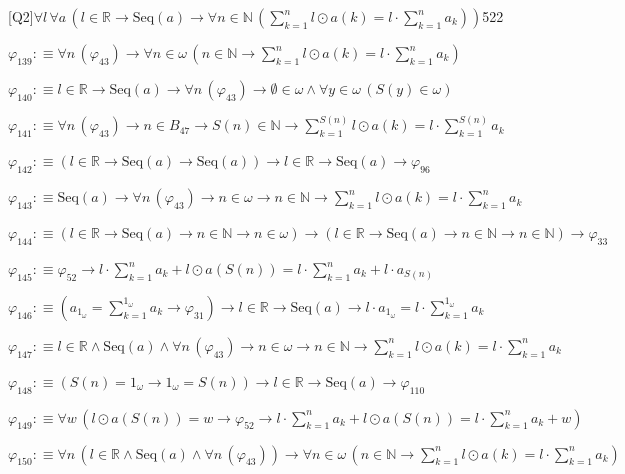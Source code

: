 \begin{fullproof}{[Q2]}{$\forall l\,\forall a\,(l \in \mathbb{R} \to \mathrm{Seq}(a) \to \forall n \in \mathbb{N}\,({\textstyle\sum_{k=1}^{n} l \odot a(k)} = l \cdot {\textstyle\sum_{k=1}^{n} a_{k}}))$}{522}
\begin{abbrevlist}
\item $\varphi_{139} :\equiv \forall n\,(\varphi_{43}) \to \forall n \in \omega\,(n \in \mathbb{N} \to {\textstyle\sum_{k=1}^{n} l \odot a(k)} = l \cdot {\textstyle\sum_{k=1}^{n} a_{k}})$
\item $\varphi_{140} :\equiv l \in \mathbb{R} \to \mathrm{Seq}(a) \to \forall n\,(\varphi_{43}) \to \emptyset \in \omega \land \forall y \in \omega\,(S(y) \in \omega)$
\item $\varphi_{141} :\equiv \forall n\,(\varphi_{43}) \to n \in B_{47} \to S(n) \in \mathbb{N} \to {\textstyle\sum_{k=1}^{S(n)} l \odot a(k)} = l \cdot {\textstyle\sum_{k=1}^{S(n)} a_{k}}$
\item $\varphi_{142} :\equiv (l \in \mathbb{R} \to \mathrm{Seq}(a) \to \mathrm{Seq}(a)) \to l \in \mathbb{R} \to \mathrm{Seq}(a) \to \varphi_{96}$
\item $\varphi_{143} :\equiv \mathrm{Seq}(a) \to \forall n\,(\varphi_{43}) \to n \in \omega \to n \in \mathbb{N} \to {\textstyle\sum_{k=1}^{n} l \odot a(k)} = l \cdot {\textstyle\sum_{k=1}^{n} a_{k}}$
\item $\varphi_{144} :\equiv (l \in \mathbb{R} \to \mathrm{Seq}(a) \to n \in \mathbb{N} \to n \in \omega) \to (l \in \mathbb{R} \to \mathrm{Seq}(a) \to n \in \mathbb{N} \to n \in \mathbb{N}) \to \varphi_{33}$
\item $\varphi_{145} :\equiv \varphi_{52} \to l \cdot {\textstyle\sum_{k=1}^{n} a_{k}} + l \odot a(S(n)) = l \cdot {\textstyle\sum_{k=1}^{n} a_{k}} + l \cdot a_{S(n)}$
\item $\varphi_{146} :\equiv (a_{1_{\omega}} = {\textstyle\sum_{k=1}^{1_{\omega}} a_{k}} \to \varphi_{31}) \to l \in \mathbb{R} \to \mathrm{Seq}(a) \to l \cdot a_{1_{\omega}} = l \cdot {\textstyle\sum_{k=1}^{1_{\omega}} a_{k}}$
\item $\varphi_{147} :\equiv l \in \mathbb{R} \land \mathrm{Seq}(a) \land \forall n\,(\varphi_{43}) \to n \in \omega \to n \in \mathbb{N} \to {\textstyle\sum_{k=1}^{n} l \odot a(k)} = l \cdot {\textstyle\sum_{k=1}^{n} a_{k}}$
\item $\varphi_{148} :\equiv (S(n) = 1_{\omega} \to 1_{\omega} = S(n)) \to l \in \mathbb{R} \to \mathrm{Seq}(a) \to \varphi_{110}$
\item $\varphi_{149} :\equiv \forall w\,(l \odot a(S(n)) = w \to \varphi_{52} \to l \cdot {\textstyle\sum_{k=1}^{n} a_{k}} + l \odot a(S(n)) = l \cdot {\textstyle\sum_{k=1}^{n} a_{k}} + w)$
\item $\varphi_{150} :\equiv \forall n\,(l \in \mathbb{R} \land \mathrm{Seq}(a) \land \forall n\,(\varphi_{43})) \to \forall n \in \omega\,(n \in \mathbb{N} \to {\textstyle\sum_{k=1}^{n} l \odot a(k)} = l \cdot {\textstyle\sum_{k=1}^{n} a_{k}})$

\end{abbrevlist}
\end{fullproof}
